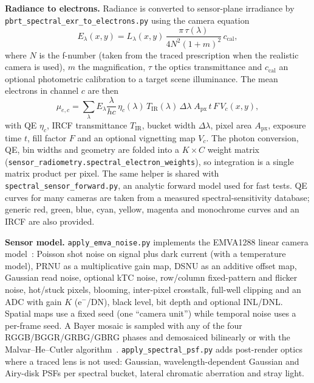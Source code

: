 \documentclass[letterpaper,twocolumn,fleqn]{article}
\begin{document}
\textbf{Radiance to electrons.} Radiance is converted to sensor-plane irradiance by \texttt{pbrt\_spectral\_exr\_to\_electrons.py} using the camera equation
\begin{equation}
E_\lambda(x,y) = L_\lambda(x,y)\,\frac{\pi\,\tau(\lambda)}{4N^2(1+m)^2}\,c_{\mathrm{cal}},
\end{equation}
where $N$ is the f-number (taken from the traced prescription when the realistic camera is used), $m$ the magnification, $\tau$ the optics transmittance and $c_{\mathrm{cal}}$ an optional photometric calibration to a target scene illuminance. The mean electrons in channel $c$ are then
\begin{equation}
\mu_{e,c} = \sum_\lambda E_\lambda \frac{\lambda}{hc}\, \eta_c(\lambda)\, T_{\mathrm{IR}}(\lambda)\, \Delta\lambda\; A_{\mathrm{px}}\, t\, F\, V_c(x,y),
\end{equation}
with QE $\eta_c$, IRCF transmittance $T_{\mathrm{IR}}$, bucket width $\Delta\lambda$, pixel area $A_{\mathrm{px}}$, exposure time $t$, fill factor $F$ and an optional vignetting map $V_c$. The photon conversion, QE, bin widths and geometry are folded into a $K\times C$ weight matrix (\texttt{sensor\_radiometry.spectral\_electron\_weights}), so integration is a single matrix product per pixel. The same helper is shared with \texttt{spectral\_sensor\_forward.py}, an analytic forward model used for fast tests. QE curves for many cameras are taken from a measured spectral-sensitivity database; generic red, green, blue, cyan, yellow, magenta and monochrome curves and an IRCF are also provided.

\textbf{Sensor model.} \texttt{apply\_emva\_noise.py} implements the EMVA1288 linear camera model~\cite{emva1288std}: Poisson shot noise on signal plus dark current (with a temperature model), PRNU as a multiplicative gain map, DSNU as an additive offset map, Gaussian read noise, optional kTC noise, row/column fixed-pattern and flicker noise, hot/stuck pixels, blooming, inter-pixel crosstalk, full-well clipping and an ADC with gain $K$ (e$^-$/DN), black level, bit depth and optional INL/DNL. Spatial maps use a fixed seed (one ``camera unit'') while temporal noise uses a per-frame seed. A Bayer mosaic is sampled with any of the four RGGB/BGGR/GRBG/GBRG phases and demosaiced bilinearly or with the Malvar--He--Cutler algorithm~\cite{malvar2004high}. \texttt{apply\_spectral\_psf.py} adds post-render optics where a traced lens is not used: Gaussian, wavelength-dependent Gaussian and Airy-disk PSFs per spectral bucket, lateral chromatic aberration and stray light.
\end{document}
